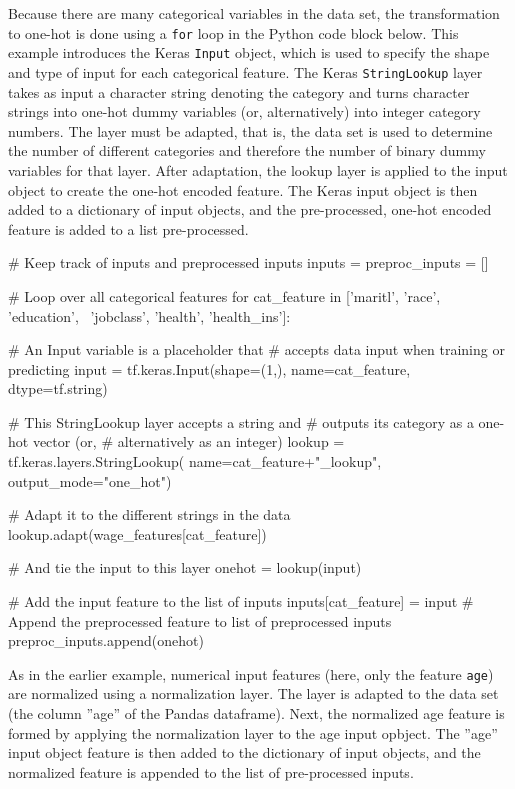 Because there are many categorical variables in the data set, the transformation to one-hot is done using a \texttt{for} loop in the Python code block below. This example introduces the Keras \texttt{Input} object, which is used to specify the shape and type of input for each categorical feature. The Keras \texttt{StringLookup} layer takes as input a character string denoting the category and turns character strings into one-hot dummy variables (or, alternatively) into integer category numbers. The layer must be adapted, that is, the data set is used to determine the number of different categories and therefore the number of binary dummy variables for that layer. After adaptation, the lookup layer is applied to the input object to create the one-hot encoded feature. The Keras input object is then added to a dictionary of input objects, and the pre-processed, one-hot encoded feature is added to a list pre-processed.

\begin{samepage}
\begin{pythoncode}
# Keep track of inputs and preprocessed inputs
inputs = {}
preproc_inputs = []

# Loop over all categorical features
for cat_feature in ['maritl', 'race', 'education', \
                    'jobclass', 'health', 'health_ins']:
               
    # An Input variable is a placeholder that
    # accepts data input when training or predicting
    input = tf.keras.Input(shape=(1,), 
       name=cat_feature, dtype=tf.string)
    
    # This StringLookup layer accepts a string and 
    # outputs its category as a one-hot vector (or, 
    # alternatively as an integer)
    lookup = tf.keras.layers.StringLookup(
        name=cat_feature+"_lookup", output_mode="one_hot")

    # Adapt it to the different strings in the data
    lookup.adapt(wage_features[cat_feature])
    
    # And tie the input to this layer
    onehot = lookup(input)
    
    # Add the input feature to the list of inputs
    inputs[cat_feature] = input
    # Append the preprocessed feature to list of preprocessed inputs
    preproc_inputs.append(onehot)
\end{pythoncode}
\end{samepage}

As in the earlier example, numerical input features (here, only the feature \texttt{age}) are normalized using a normalization layer. The layer is adapted to the data set (the column ''age'' of the Pandas dataframe). Next, the normalized age feature is formed by applying the normalization layer to the age input opbject. The ''age'' input object feature is then added to the dictionary of input objects, and the normalized feature is appended to the list of pre-processed inputs. 

